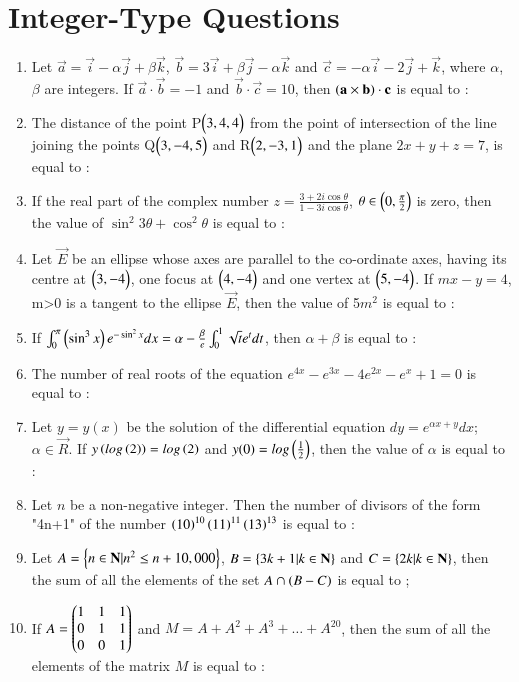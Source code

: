 \documentclass[journal,12pt,onecolumn]{IEEEtran}
\theoremstyle{remark}
\begin{document}
\section{Integer-Type Questions}
\begin{enumerate}
	\item Let $\vec{a} = \vec{i} - \alpha\vec{j} + \beta\vec{k}$, $\vec{b} = 3\vec{i} + \beta\vec{j} - \alpha\vec{k}$ and $\vec{c} = -\alpha\vec{i} - 2\vec{j} + \vec{k}$, where $\alpha$, $\beta$ are integers. If $\vec{a} \cdot \vec{b} = -1$ and $\vec{b} \cdot \vec{c} = 10$, then $\left(\mathbf{a} \times \mathbf{b}\right) \cdot \mathbf{c}$ is equal to :
	\item The distance of the point P$\begin{pmatrix}3,4,4\end{pmatrix}$ from the point of intersection of the line joining the points Q$\begin{pmatrix}3,-4,5\end{pmatrix}$ and R$\begin{pmatrix}2,-3,1\end{pmatrix}$ and the plane $2x+y+z=7$, is equal to :
	\item If the real part of the complex number $ z = \frac{3+2i\cos{\theta}}{1-3i\cos{\theta}}$, $\theta \in \left(0, \frac{\pi}{2}\right)$ is zero, then the value of $\sin^{2}{3\theta} + \cos^{2}{\theta}$ is equal to :
	\item Let $\vec{E}$ be an ellipse whose axes are parallel to the co-ordinate axes, having its centre at $\begin{pmatrix}3,-4\end{pmatrix}$, one focus at $\begin{pmatrix}4,-4\end{pmatrix}$ and one vertex at $\begin{pmatrix}5,-4\end{pmatrix}$. If $mx - y = 4$, m>0 is a tangent to the ellipse $\vec{E}$, then the value of 5$m^2$ is equal to :
	\item If $\int_{0}^{\pi} \left(\sin^{3}{x}\right)e^{-\sin^{2}{x}} dx = \alpha - \frac{\beta}{e} \int_{0}^{1} \sqrt{t}e^{t} dt$, then $\alpha + \beta$ is equal to :
	\item The number of real roots of the equation $ e^{4x} - e^{3x} - 4e^{2x} - e^{x} + 1 = 0$ is equal to :
	\item Let $ y = y(x) $ be the solution of the differential equation $ dy = e^{\alpha x + y} dx $; $\alpha \in \vec{R}$. If $ y\left(log\left(2\right)\right) = log\left(2\right)$ and $y(0) = log\left(\frac{1}{2}\right)$, then the value of $\alpha$ is equal to :
	\item Let $n$ be a non-negative integer. Then the number of divisors of the form "4n+1" of the number $\left(10\right)^{10}\left(11\right)^{11}\left(13\right)^{13}$ is equal to :
	\item Let $A = \left\{n \in \mathbf{N} | n^2 \leq n + 10,000\right\}$, $B = \left\{3k+1 | k \in \mathbf{N}\right\}$ and $C = \left\{2k | k \in \mathbf{N}\right\}$, then the sum of all the elements of the set $ A \cap \left( B-C\right)$ is equal to ;
	\item If $A = \begin{pmatrix}1&1&1\\0&1&1\\0&0&1\end{pmatrix}$ and $M = A + A^2 + A^3 + \dots + A^{20} $, then the sum of all the elements of the matrix $M$ is equal to :
\end{enumerate}
\end{document}
